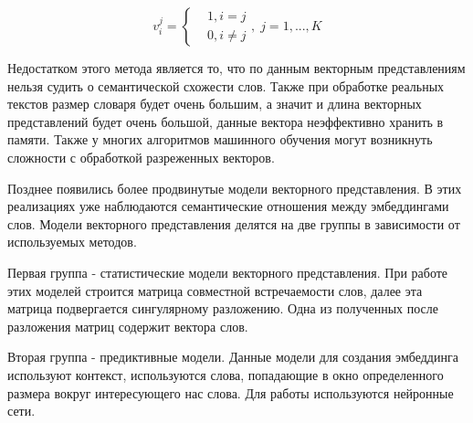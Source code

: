 \documentclass[a4paper,14pt]{article}
\begin{document}
\begin{equation}
	v_i^j = \left\{
	\begin{matrix}
		& 1, i = j\\
		& 0, i \neq j
	\end{matrix}
	\right.
	,\;j = 1, ..., K	
	\label{fraq:one-hot}
\end{equation}

Недостатком этого метода является то, что по данным векторным представлениям нельзя судить о семантической схожести слов.
Также при обработке реальных текстов размер словаря будет очень большим, а значит и длина векторных представлений будет очень большой, данные вектора неэффективно хранить в памяти.
Также у многих алгоритмов машинного обучения могут возникнуть сложности с обработкой разреженных векторов.

Позднее появились более продвинутые модели векторного представления.
В этих реализациях уже наблюдаются семантические отношения между эмбеддингами слов.
Модели векторного представления делятся на две группы в зависимости от используемых методов.

Первая группа - статистические модели векторного представления.
При работе этих моделей строится матрица совместной встречаемости слов, далее эта матрица подвергается сингулярному разложению.
Одна из полученных после разложения матриц содержит вектора слов.


Вторая группа - предиктивные модели.
Данные модели для создания эмбеддинга используют контекст, используются слова, попадающие в окно определенного размера вокруг интересующего нас слова.
Для работы используются нейронные сети.
\end{document}
